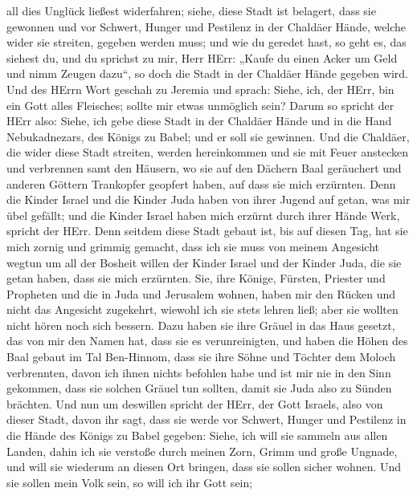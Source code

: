 all dies Unglück ließest widerfahren;  siehe, diese Stadt
ist belagert, dass sie gewonnen und vor Schwert, Hunger und Pestilenz in
der Chaldäer Hände, welche wider sie streiten, gegeben werden muss; und
wie du geredet hast, so geht es, das siehest du,  und du
sprichst zu mir, Herr HErr: „Kaufe du einen Acker um Geld und nimm
Zeugen dazu``, so doch die Stadt in der Chaldäer Hände gegeben wird.
 Und des HErrn Wort geschah zu Jeremia und sprach:
 Siehe, ich, der HErr, bin ein Gott alles Fleisches; sollte
mir etwas unmöglich sein?  Darum so spricht der HErr also:
Siehe, ich gebe diese Stadt in der Chaldäer Hände und in die Hand
Nebukadnezars, des Königs zu Babel; und er soll sie gewinnen.
 Und die Chaldäer, die wider diese Stadt streiten, werden
hereinkommen und sie mit Feuer anstecken und verbrennen samt den
Häusern, wo sie auf den Dächern Baal geräuchert und anderen Göttern
Trankopfer geopfert haben, auf dass sie mich erzürnten. 
Denn die Kinder Israel und die Kinder Juda haben von ihrer Jugend auf
getan, was mir übel gefällt; und die Kinder Israel haben mich erzürnt
durch ihrer Hände Werk, spricht der HErr.  Denn seitdem
diese Stadt gebaut ist, bis auf diesen Tag, hat sie mich zornig und
grimmig gemacht, dass ich sie muss von meinem Angesicht wegtun
 um all der Bosheit willen der Kinder Israel und der Kinder
Juda, die sie getan haben, dass sie mich erzürnten. Sie, ihre Könige,
Fürsten, Priester und Propheten und die in Juda und Jerusalem wohnen,
 haben mir den Rücken und nicht das Angesicht zugekehrt,
wiewohl ich sie stets lehren ließ; aber sie wollten nicht hören noch
sich bessern.  Dazu haben sie ihre Gräuel in das Haus
gesetzt, das von mir den Namen hat, dass sie es verunreinigten,
 und haben die Höhen des Baal gebaut im Tal Ben-Hinnom,
dass sie ihre Söhne und Töchter dem Moloch verbrennten, davon ich ihnen
nichts befohlen habe und ist mir nie in den Sinn gekommen, dass sie
solchen Gräuel tun sollten, damit sie Juda also zu Sünden brächten.
 Und nun um deswillen spricht der HErr, der Gott Israels,
also von dieser Stadt, davon ihr sagt, dass sie werde vor Schwert,
Hunger und Pestilenz in die Hände des Königs zu Babel gegeben:
 Siehe, ich will sie sammeln aus allen Landen, dahin ich
sie verstoße durch meinen Zorn, Grimm und große Ungnade, und will sie
wiederum an diesen Ort bringen, dass sie sollen sicher wohnen.
 Und sie sollen mein Volk sein, so will ich ihr Gott sein;
